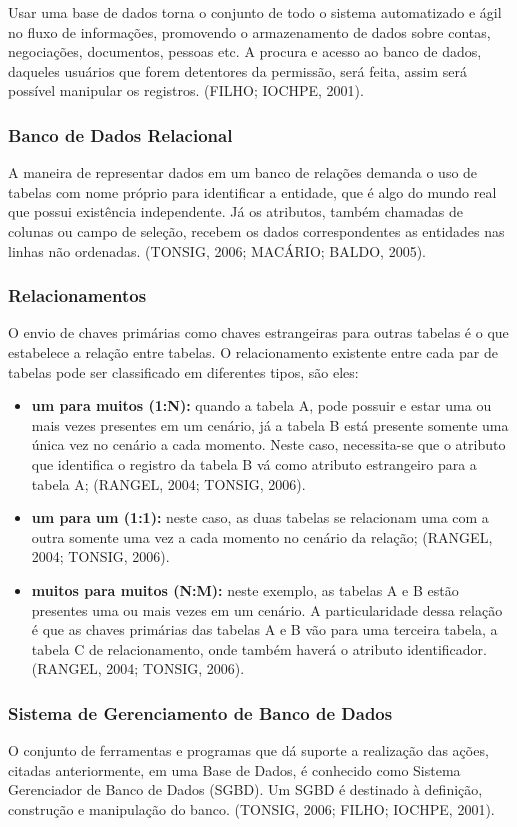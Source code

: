 \documentclass[a4paper,12pt]{article}
\begin{document}
Usar uma base de dados torna o conjunto de todo o sistema automatizado e ágil no fluxo de informações, promovendo o armazenamento 
de dados sobre contas, negociações, documentos, pessoas etc. A procura e acesso ao banco de dados, daqueles usuários que forem detentores 
da permissão, será feita, assim será possível manipular os registros. (FILHO; IOCHPE, 2001).

\subsubsection{Banco de Dados Relacional}
A maneira de representar dados em um banco de relações demanda o uso de tabelas com nome próprio para identificar a entidade, que é 
algo do mundo real que possui existência independente. Já os atributos, também chamadas de colunas ou campo de seleção, recebem os 
dados correspondentes as entidades nas linhas não ordenadas. (TONSIG, 2006; MACÁRIO; BALDO, 2005). 

\subsubsection{Relacionamentos}
O envio de chaves primárias como chaves estrangeiras para outras tabelas é o que estabelece a relação entre tabelas. O relacionamento 
existente entre cada par de tabelas pode ser classificado em diferentes tipos, são eles:
\begin{itemize}
	\item\textbf{um para muitos (1:N):} quando a tabela A, pode possuir e estar uma ou mais vezes presentes em um cenário, já a tabela B está presente somente uma 
	única vez no cenário a cada momento. Neste caso, necessita-se que o atributo que identifica o registro da tabela B vá como atributo estrangeiro para 
	a tabela A; (RANGEL, 2004; TONSIG, 2006).
	\item\textbf{um para um (1:1):} neste caso, as duas tabelas se relacionam uma com a outra somente uma vez a cada momento 
	no cenário da relação; (RANGEL, 2004; TONSIG, 2006).
	\item\textbf{muitos para muitos (N:M):} neste exemplo, as tabelas A e B estão presentes uma ou mais vezes em um cenário. 
	A particularidade dessa relação é que as chaves primárias das tabelas A e B vão para uma terceira tabela, a tabela C de relacionamento, 
	onde também haverá o atributo identificador. (RANGEL, 2004; TONSIG, 2006).
\end{itemize}

\subsubsection{Sistema de Gerenciamento de Banco de Dados}
O conjunto de ferramentas e programas que dá suporte a realização das ações, citadas anteriormente, em uma Base de Dados, é conhecido como 
Sistema Gerenciador de Banco de Dados (SGBD). Um SGBD é destinado à definição, construção e manipulação do banco. (TONSIG, 2006; FILHO; IOCHPE, 2001). 
\end{document}
